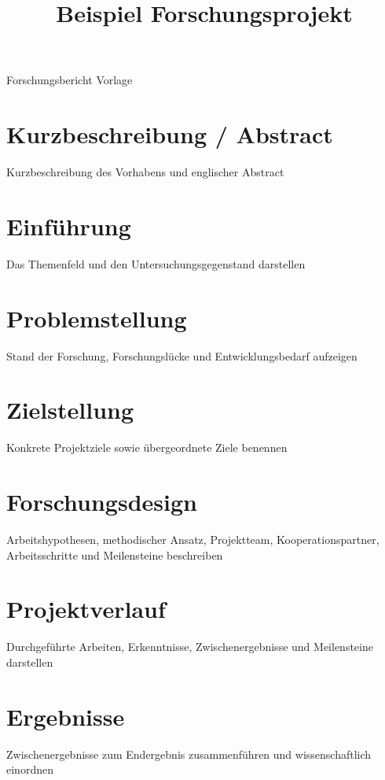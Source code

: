 \title{Beispiel Forschungsprojekt}




\makecoverpages

\begin{Panel}[anchor=top-right, x=1cm, y=5cm, width=5.5cm]
  Forschungsbericht Vorlage
\end{Panel}

\makefundingacknowledgement
\tableofcontents

\chapter*{Kurzbeschreibung / Abstract}
Kurzbeschreibung des Vorhabens und englischer Abstract

\chapter{Einführung}
Das Themenfeld und den Untersuchungsgegenstand darstellen

\chapter{Problemstellung}
Stand der Forschung, Forschungslücke und Entwicklungsbedarf aufzeigen \cite{building2025}

\chapter{Zielstellung}
Konkrete Projektziele sowie übergeordnete Ziele benennen

\chapter{Forschungsdesign}
Arbeitshypothesen, methodischer Ansatz, Projektteam, Kooperationspartner, Arbeitsschritte und Meilensteine beschreiben \cite{example2026,shapegrammar2024}

\chapter{Projektverlauf}
Durchgeführte Arbeiten, Erkenntnisse, Zwischenergebnisse und Meilensteine darstellen

\chapter{Ergebnisse}
Zwischenergebnisse zum Endergebnis zusammenführen und wissenschaftlich einordnen

